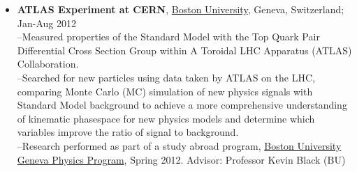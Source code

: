 \begin{itemize}
\item{\textbf {ATLAS Experiment at CERN}, \href{http://www.bu.edu/abroad/programs/geneva-physics-program/}{Boston University}, Geneva, Switzerland; Jan-Aug 2012\\
--Measured properties of the Standard Model with the Top Quark Pair Differential Cross Section Group within A Toroidal LHC Apparatus (ATLAS) Collaboration.\\
--Searched for new particles using data taken by ATLAS on the LHC, comparing Monte Carlo (MC) simulation of new physics signals with Standard Model background to achieve a more comprehensive understanding of kinematic phasespace for new physics models and determine which variables improve the ratio of signal to background.\\
--Research performed as part of a study abroad program, \href{http://physics.bu.edu/sites/geneva-program/}{Boston University Geneva Physics Program}, Spring 2012. Advisor: Professor Kevin Black (BU)\\ }

\end{itemize}
